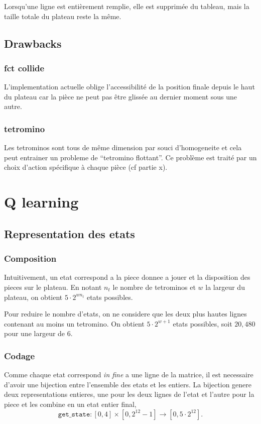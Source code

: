 \documentclass{article}
\begin{document}
Lorsqu'une ligne est entièrement remplie, elle est supprimée du tableau, mais
la taille totale du plateau reste la même.

\subsection{Drawbacks}
\subsubsection{fct collide}
L'implementation actuelle oblige l'accessibilit\'e de la position finale depuis
le haut du plateau car la pi\`ece ne peut pas \^etre gliss\'ee au dernier moment
sous une autre.
\subsubsection{tetromino}
Les tetrominos sont tous de même dimension par souci d'homogeneite et cela
peut entrainer un probleme de ``tetromino flottant''. Ce problème est traité par
un choix d'action spécifique à chaque pièce (cf partie x).
\section{Q learning}

\subsection{Representation des etats}
\subsubsection{Composition}
Intuitivement, un etat correspond a la piece donnee a jouer et la disposition
des pieces sur le plateau. En notant \(n_t\) le nombre de tetrominos et \(w\) la
largeur du plateau, on obtient \(5 \cdot 2^{wn_t}\) etats possibles.

Pour reduire le nombre d'etats, on ne considere que les deux plus hautes lignes
contenant au moins un tetromino. On obtient \(5\cdot 2^{w+1}\) etats possibles,
soit \(20,480\) pour une largeur de 6.

\subsubsection{Codage}
Comme chaque etat correspond \textit{in fine} a une ligne de la matrice, il est
necessaire d'avoir une bijection entre l'ensemble des etats et les entiers. La
bijection genere deux representations entieres, une pour les deux lignes de
l'etat et l'autre pour la piece et les combine en un etat entier final,
\[
  \texttt{get\_state}\colon [0,4]\times [0, 2^{12} - 1] \to [0, 5\cdot 2^{12}].
\]
\end{document}
